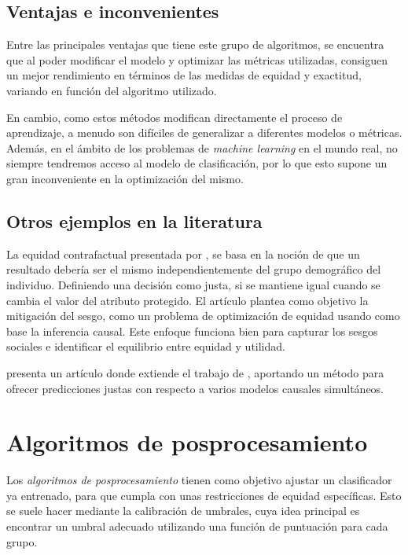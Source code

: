 \documentclass[oneside,openright,titlepage,numbers=noenddot,openany,headinclude,footinclude=true,
cleardoublepage=empty,abstractoff,BCOR=5mm,paper=a4,fontsize=12pt,main=spanish]{scrreprt}
\begin{document}
\subsection*{Ventajas e inconvenientes}

Entre las principales ventajas que tiene este grupo de algoritmos, se encuentra que al poder modificar el modelo y optimizar las métricas utilizadas, consiguen un mejor rendimiento en términos de las medidas de equidad y exactitud, variando en función del algoritmo utilizado.

En cambio, como estos métodos modifican directamente el proceso de aprendizaje, a menudo son difíciles de generalizar a diferentes modelos o métricas. Además, en el ámbito de los problemas de \textit{machine learning} en el mundo real, no siempre tendremos acceso al modelo de clasificación, por lo que esto supone un gran inconveniente en la optimización del mismo.

\clearpage

\subsection*{Otros ejemplos en la literatura}

La equidad contrafactual presentada por \cite{counterfactual2018}, se basa en la noción de que un resultado debería ser el mismo independientemente del grupo demográfico del individuo. Definiendo una decisión como justa, si se mantiene igual cuando se cambia el valor del atributo protegido. El artículo plantea como objetivo la mitigación del sesgo, como un problema de optimización de equidad usando como base la inferencia causal. Este enfoque funciona bien para capturar los sesgos sociales e identificar el equilibrio entre equidad y utilidad. 

\cite{worlds2017} presenta un artículo donde extiende el trabajo de \cite{counterfactual2018}, aportando un método para ofrecer predicciones justas con respecto a varios modelos causales simultáneos.

\section{Algoritmos de posprocesamiento}

Los \textit{algoritmos de posprocesamiento} tienen como objetivo ajustar un clasificador ya entrenado, para que cumpla con unas restricciones de equidad específicas. Esto se suele hacer mediante la calibración de umbrales, cuya idea principal es encontrar un umbral adecuado utilizando una función de puntuación para cada grupo.
\end{document}
